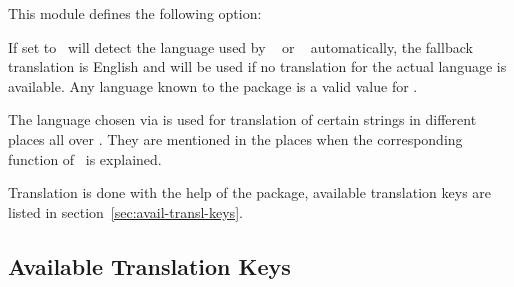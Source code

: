 \documentclass{chemmacros-manual}
\begin{document}
This module defines the following option:
\begin{options}
    If set to  \chemmacros\ will detect the language used by
    ~\cite{pkg:babel} or ~\cite{pkg:polyglossia}
    automatically, the fallback translation is English and will be used if no 
    translation for the actual language is available.  Any language known to
    the  package is a valid value for .
\end{options}

The language chosen via  is used for translation of certain
strings in different places all over \chemmacros.  They are mentioned in the
places when the corresponding function of \chemmacros\ is explained.

Translation is done with the help of the  package, available
translation keys are listed in section~\vref{sec:avail-transl-keys}.

\subsection{Available Translation Keys}\label{sec:avail-transl-keys}
\end{document}
